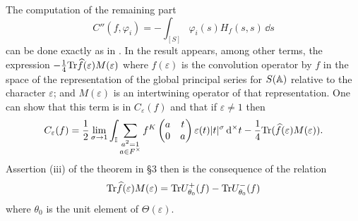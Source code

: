 The computation of the remaining part
\[
C''(f, \varphi_i) = - \int_{[S]} \varphi_i(s) H_f(s, s) \, \dd s
\]
can be done exactly as in \cite{duflo1971formule}.
In the result appears, among other terms, the expression $-\frac{1}{4} \mathrm{Tr} \widehat{f}(\varepsilon) M(\varepsilon)$ where $\widehat{f}(\varepsilon)$ is the convolution operator by $f$ in the space of the representation of the global principal series for $S(\mathbb{A})$ relative to the character $\varepsilon$; and $M(\varepsilon)$ is an intertwining operator of that representation.
One can show that this term is in $C_\varepsilon(f)$ and that if $\varepsilon \ne 1$ then
\[
C_\varepsilon(f) = \frac{1}{2} \lim_{\sigma \to 1} \int_{\mathbb{I}} \sum_{\substack{a^2 = 1 \\ a \in F^\times}} f^K\begin{pmatrix}
    a & t \\ 0 & a
\end{pmatrix} \varepsilon(t) |t|^{\sigma} \, \mathrm{d}^\times t - \frac{1}{4} \mathrm{Tr} (\widehat{f}(\varepsilon) M(\varepsilon)).
\]
Assertion (iii) of the theorem in \S 3 then is the consequence of the relation
\[
\mathrm{Tr} \widehat{f}(\varepsilon) M(\varepsilon) = \mathrm{Tr} U^+_{\theta_0}(f) - \mathrm{Tr} U^-_{\theta_0}(f)
\]
where $\theta_0$ is the unit element of $\Theta(\varepsilon)$.
